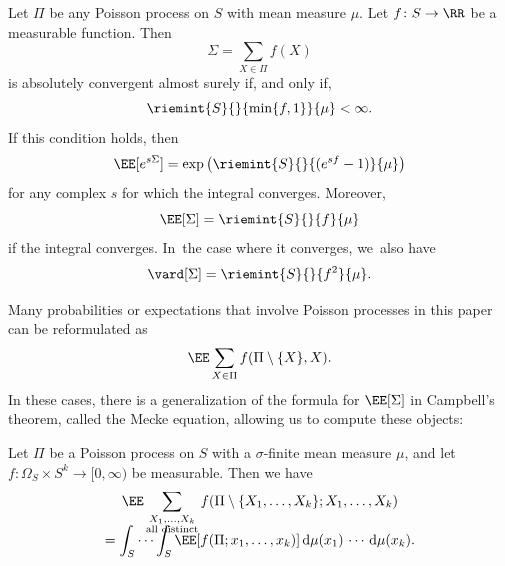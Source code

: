 \begin{prop}
\label{prel:campbell}
Let $\Pi$ be any Poisson process on $S$ with mean measure $\mu$. Let $f\colon S \to \RR$ be a measurable function. Then
\[
\Sigma = \sum_{X \in \Pi} f(X)
\]
is absolutely convergent almost surely if, and only if,
\[
\riemint{S}{}{\min\{f, 1\}}{\mu} < \infty.
\]
If this condition holds, then
\[
\EE[e^{s\Sigma}] = \exp\left(\riemint{S}{}{(e^{sf} - 1)}{\mu}\right)
\]
for any complex $s$ for which the integral converges. Moreover,
\[
\EE[\Sigma] = \riemint{S}{}{f}{\mu}
\]
if the integral converges. In~the case where it converges, we~also have
\[
\vard[\Sigma] = \riemint{S}{}{f^2}{\mu}.
\]
\end{prop}

Many probabilities or expectations that involve Poisson processes in this paper can be reformulated as
\[
\EE \sum_{X \in \Pi} f(\Pi\setminus \{X\}, X).
\]
In these cases, there is a generalization of the formula for $\EE[\Sigma]$ in Campbell's theorem, called the Mecke equation, allowing us to compute these objects:

\begin{prop}
\label{prel:mecke}
Let $\Pi$ be a Poisson process on $S$ with a $\sigma$-finite mean measure $\mu$, and let $f: \Omega_S \times S^k \to [0, \infty)$ be measurable. Then we have
\begin{multline*}
\EE \sum_{\substack{X_1, \ldots, X_k \\ \text{all distinct}}} f(\Pi\setminus \{X_1, \ldots, X_k\}; X_1, \ldots, X_k) \\[-10pt]
= \int_S \cdots \int_S \EE[f(\Pi; x_1, \ldots, x_k)] \, \mathrm d\mu(x_1)\, \cdots\, \mathrm d\mu(x_k).
\end{multline*}
\end{prop}
